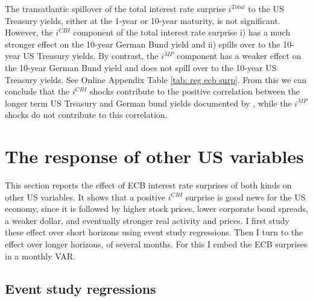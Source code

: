 \documentclass[a4paper,12pt]{article}
\begin{document}
The transatlantic spillover of the total interest rate surprise $i^{Total}$ to the US Treasury yields, either at the 1-year or 10-year maturity, is not significant. However, the $i^{CBI}$ component of the total interest rate surprise
i) has a much stronger effect on the 10-year German Bund yield and ii) spills over to the 10-year US Treasury yields. By contrast, the $i^{MP}$ component has a weaker effect on the 10-year German Bund yield and does not spill over to the 10-year US Treasury yields.
See Online Appendix Table \ref{tab: reg ecb surp}.
From this we can conclude that the $i^{CBI}$ shocks contribute to the positive correlation between the longer term US Treasury and German bund yields documented by \cite{Curcuru_etal_2018}, while the $i^{MP}$ shocks do not contribute to this correlation.


\section{The response of other US variables}

This section reports the effect of ECB interest rate surprises of both kinds on other US variables.
It shows that a positive  $i^{CBI}$  surprise is good news for the US economy, since
it is followed by higher stock prices, lower corporate bond spreads, a weaker dollar,
and eventually stronger real activity and prices. 
I first study these effect over short horizons using event study regressions.
Then I turn to the effect over longer horizons, of several months. For this I embed the ECB surprises in a monthly VAR.


\subsection{Event study regressions}
\end{document}

